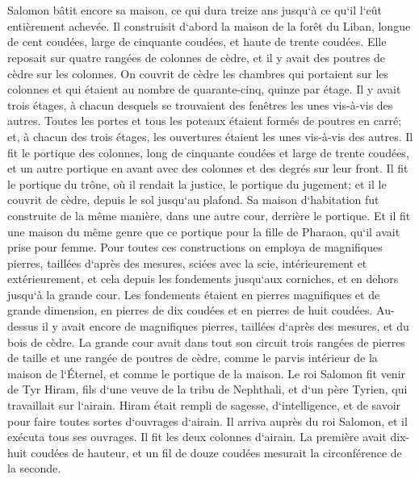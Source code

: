 \chapter{}

\verse Salomon bâtit encore sa maison, ce qui dura treize ans jusqu`à ce qu`il l`eût entièrement achevée. 
\verse Il construisit d`abord la maison de la forêt du Liban, longue de cent coudées, large de cinquante coudées, et haute de trente coudées. Elle reposait sur quatre rangées de colonnes de cèdre, et il y avait des poutres de cèdre sur les colonnes. 
\verse On couvrit de cèdre les chambres qui portaient sur les colonnes et qui étaient au nombre de quarante-cinq, quinze par étage. 
\verse Il y avait trois étages, à chacun desquels se trouvaient des fenêtres les unes vis-à-vis des autres. 
\verse Toutes les portes et tous les poteaux étaient formés de poutres en carré; et, à chacun des trois étages, les ouvertures étaient les unes vis-à-vis des autres. 
\verse Il fit le portique des colonnes, long de cinquante coudées et large de trente coudées, et un autre portique en avant avec des colonnes et des degrés sur leur front. 
\verse Il fit le portique du trône, où il rendait la justice, le portique du jugement; et il le couvrit de cèdre, depuis le sol jusqu`au plafond. 
\verse Sa maison d`habitation fut construite de la même manière, dans une autre cour, derrière le portique. Et il fit une maison du même genre que ce portique pour la fille de Pharaon, qu`il avait prise pour femme. 
\verse Pour toutes ces constructions on employa de magnifiques pierres, taillées d`après des mesures, sciées avec la scie, intérieurement et extérieurement, et cela depuis les fondements jusqu`aux corniches, et en dehors jusqu`à la grande cour. 
\verse Les fondements étaient en pierres magnifiques et de grande dimension, en pierres de dix coudées et en pierres de huit coudées. 
\verse Au-dessus il y avait encore de magnifiques pierres, taillées d`après des mesures, et du bois de cèdre. 
\verse La grande cour avait dans tout son circuit trois rangées de pierres de taille et une rangée de poutres de cèdre, comme le parvis intérieur de la maison de l`Éternel, et comme le portique de la maison. 
\verse Le roi Salomon fit venir de Tyr Hiram, 
\verse fils d`une veuve de la tribu de Nephthali, et d`un père Tyrien, qui travaillait sur l`airain. Hiram était rempli de sagesse, d`intelligence, et de savoir pour faire toutes sortes d`ouvrages d`airain. Il arriva auprès du roi Salomon, et il exécuta tous ses ouvrages. 
\verse Il fit les deux colonnes d`airain. La première avait dix-huit coudées de hauteur, et un fil de douze coudées mesurait la circonférence de la seconde. 
